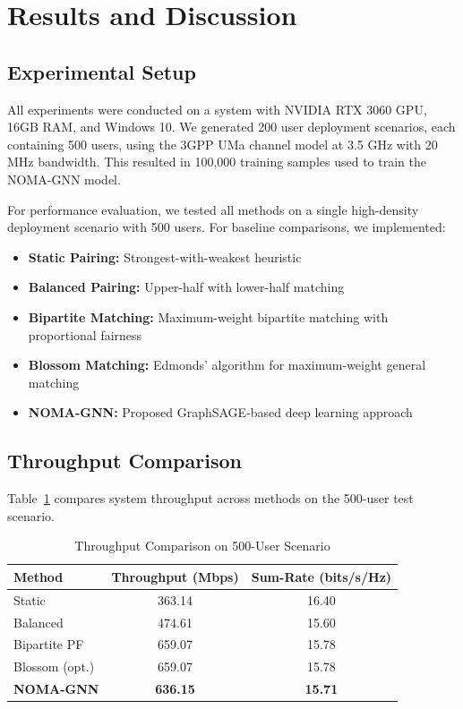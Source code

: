 \section{Results and Discussion}

\subsection{Experimental Setup}

All experiments were conducted on a system with NVIDIA RTX 3060 GPU, 16GB RAM, and Windows 10. We generated 200 user deployment scenarios, each containing 500 users, using the 3GPP UMa channel model at 3.5 GHz with 20 MHz bandwidth. This resulted in 100,000 training samples used to train the NOMA-GNN model.

For performance evaluation, we tested all methods on a single high-density deployment scenario with 500 users. For baseline comparisons, we implemented:
\begin{itemize}
    \item \textbf{Static Pairing:} Strongest-with-weakest heuristic
    \item \textbf{Balanced Pairing:} Upper-half with lower-half matching
    \item \textbf{Bipartite Matching:} Maximum-weight bipartite matching with proportional fairness
    \item \textbf{Blossom Matching:} Edmonds' algorithm for maximum-weight general matching
    \item \textbf{NOMA-GNN:} Proposed GraphSAGE-based deep learning approach
\end{itemize}

\subsection{Throughput Comparison}

Table~\ref{tab:throughput_stats} compares system throughput across methods on the 500-user test scenario.

\begin{table}[!t]
\centering
\caption{Throughput Comparison on 500-User Scenario}
\label{tab:throughput_stats}
\begin{tabular}{l c c}
\toprule
\textbf{Method} & \textbf{Throughput (Mbps)} & \textbf{Sum-Rate (bits/s/Hz)} \\
\midrule
Static & 363.14 & 16.40 \\
Balanced & 474.61 & 15.60 \\
Bipartite PF & 659.07 & 15.78 \\
Blossom (opt.) & 659.07 & 15.78 \\
\textbf{NOMA-GNN} & \textbf{636.15} & \textbf{15.71} \\
\bottomrule
\end{tabular}
\end{table}

